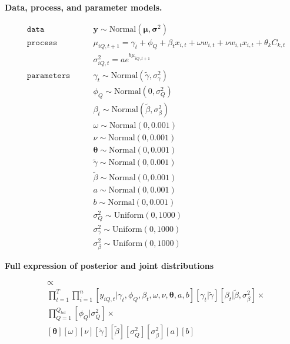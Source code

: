\documentclass[12pt,]{article}
\begin{document}
\textbf{Data, process, and parameter models.}

\begin{align}
&\mathtt{data} \qquad &\textbf{y} \sim \text{Normal}(\boldsymbol{\mu}, \boldsymbol{\sigma}^2) \\
&\mathtt{process} \qquad &\mu_{iQ,t+1} = \gamma_{t} + \phi_{Q} + \beta_{t}x_{i,t} + \omega w_{i,t} + \nu w_{i,t}x_{i,t} + \theta_{k}C_{k,t} \\
& \qquad & \sigma^2_{iQ,t} = ae^{b\mu_{iQ,t+1}} \\
&\mathtt{parameters} \qquad &\gamma_{t} \sim \text{Normal}(\tilde{\gamma}, \sigma_\gamma^2)\\
& \qquad & \phi_{Q} \sim \text{Normal}(0,\sigma_Q^2) \\
& \qquad & \beta_{t} \sim \text{Normal}(\tilde{\beta}, \sigma_\beta^2) \\
& \qquad & \omega \sim \text{Normal}(0, 0.001) \\
& \qquad & \nu \sim \text{Normal}(0, 0.001) \\
& \qquad & \boldsymbol{\theta} \sim \text{Normal}(0, 0.001) \\
& \qquad & \tilde{\gamma} \sim \text{Normal}(0, 0.001) \\
& \qquad & \tilde{\beta} \sim \text{Normal}(0, 0.001) \\
& \qquad & a \sim \text{Normal}(0, 0.001) \\
& \qquad & b \sim \text{Normal}(0, 0.001) \\
& \qquad & \sigma_Q^2 \sim \text{Uniform}(0, 1000) \\
& \qquad & \sigma_\gamma^2 \sim \text{Uniform}(0, 1000) \\
& \qquad & \sigma_\beta^2 \sim \text{Uniform}(0, 1000)
\end{align}

\textbf{Full expression of posterior and joint distributions}

\begin{align}
[\boldsymbol{\gamma}, \tilde{\gamma}, \boldsymbol{\phi}, \boldsymbol{\beta}, \tilde{\beta}, \omega, \nu, \boldsymbol{\theta}, a, b, \sigma_Q^2, \sigma_\beta^2] &\propto \\
&\prod_{t=1}^T \prod_{i=1}^n [y_{iQ,t} | \gamma_{t}, \phi_{Q}, \beta_{t}, \omega, \nu, \boldsymbol{\theta}, a, b] [\gamma_{t} | \tilde{\gamma}] [\beta_{t} | \tilde{\beta}, \sigma_\beta^2] \times \\
&\prod_{Q=1}^{Q_{tot}} [\phi_{Q} | \sigma_Q^2] \times \\
&[\boldsymbol{\theta}] [\omega] [\nu] [\tilde{\gamma}] [\tilde{\beta}] [\sigma_Q^2] [\sigma_\beta^2] [a] [b]
\end{align}
\end{document}
